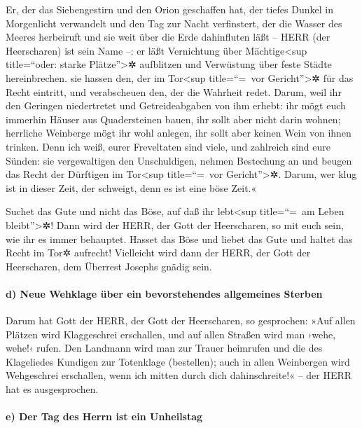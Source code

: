Er, der das Siebengestirn und den Orion geschaffen hat,
der tiefes Dunkel in Morgenlicht verwandelt und den Tag zur Nacht
verfinstert, der die Wasser des Meeres herbeiruft und sie weit über die
Erde dahinfluten läßt -- HERR (der Heerscharen) ist sein Name --:
er läßt Vernichtung über Mächtige\textless sup
title=``oder: starke Plätze''\textgreater✲ aufblitzen und Verwüstung
über feste Städte hereinbrechen. sie hassen den, der im
Tor\textless sup title=``=~vor Gericht''\textgreater✲ für das Recht
eintritt, und verabscheuen den, der die Wahrheit redet.
Darum, weil ihr den Geringen niedertretet und
Getreideabgaben von ihm erhebt: ihr mögt euch immerhin Häuser aus
Quadersteinen bauen, ihr sollt aber nicht darin wohnen; herrliche
Weinberge mögt ihr wohl anlegen, ihr sollt aber keinen Wein von ihnen
trinken. Denn ich weiß, eurer Freveltaten sind viele, und
zahlreich sind eure Sünden: sie vergewaltigen den Unschuldigen, nehmen
Bestechung an und beugen das Recht der Dürftigen im Tor\textless sup
title=``=~vor Gericht''\textgreater✲. Darum, wer klug ist
in dieser Zeit, der schweigt, denn es ist eine böse Zeit.«

Suchet das Gute und nicht das Böse, auf daß ihr
lebt\textless sup title=``=~am Leben bleibt''\textgreater✲! Dann wird
der HERR, der Gott der Heerscharen, so mit euch sein, wie ihr es immer
behauptet. Hasset das Böse und liebet das Gute und haltet
das Recht im Tor✲ aufrecht! Vielleicht wird dann der HERR, der Gott der
Heerscharen, dem Überrest Josephs gnädig sein.

\hypertarget{d-neue-wehklage-uxfcber-ein-bevorstehendes-allgemeines-sterben}{%
\paragraph{d) Neue Wehklage über ein bevorstehendes allgemeines
Sterben}\label{d-neue-wehklage-uxfcber-ein-bevorstehendes-allgemeines-sterben}}

Darum hat Gott der HERR, der Gott der Heerscharen, so
gesprochen: »Auf allen Plätzen wird Klaggeschrei erschallen, und auf
allen Straßen wird man ›wehe, wehe!‹ rufen. Den Landmann wird man zur
Trauer heimrufen und die des Klageliedes Kundigen zur Totenklage
(bestellen); auch in allen Weinbergen wird Wehgeschrei
erschallen, wenn ich mitten durch dich dahinschreite!« -- der HERR hat
es ausgesprochen.

\hypertarget{e-der-tag-des-herrn-ist-ein-unheilstag}{%
\paragraph{e) Der Tag des Herrn ist ein
Unheilstag}\label{e-der-tag-des-herrn-ist-ein-unheilstag}}

